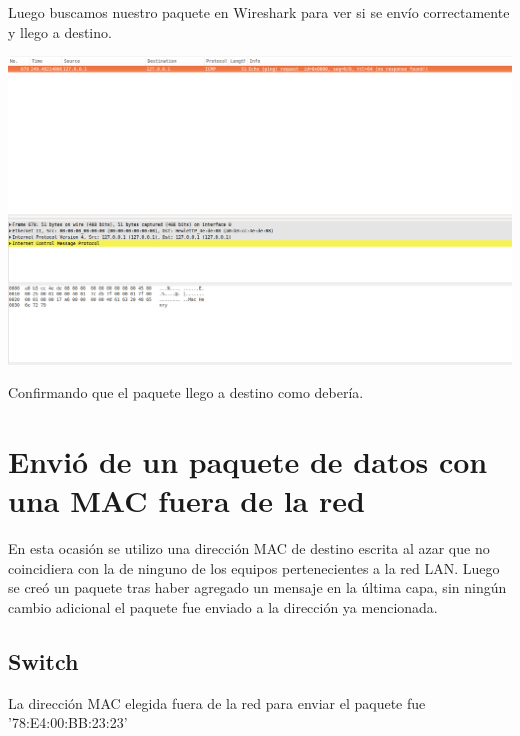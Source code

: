 \documentclass[spanish]{udpreport}
\begin{document}
Luego buscamos nuestro paquete en Wireshark para ver si se envío correctamente y llego a destino.\\

\begin{center}
	\includegraphics[scale=.27]{imagenes/Hub/ipmanti.png}
\end{center}

Confirmando que el paquete llego a destino como debería.

\pagebreak

\section{Envió de un paquete de datos con una MAC fuera de la red}

En esta ocasión se utilizo una dirección MAC de destino escrita al azar que no coincidiera con la de ninguno de los equipos pertenecientes a la red LAN. Luego se creó un paquete tras haber agregado un mensaje en la última capa, sin ningún cambio adicional el paquete fue enviado a la dirección ya mencionada.


\subsection{Switch}

La dirección MAC elegida fuera de la red para enviar el paquete fue '78:E4:00:BB:23:23'
\end{document}
